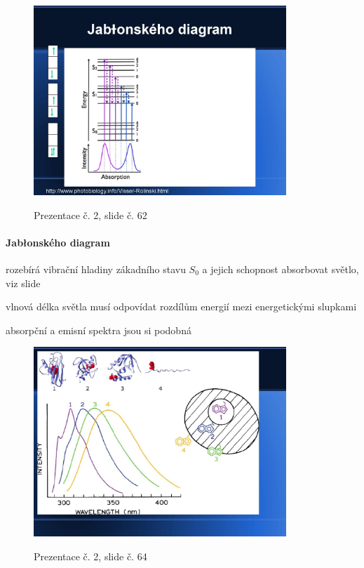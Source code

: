 \documentclass[DIV=8]{scrreprt}
\begin{document}
\begin{figure}
    \caption{Prezentace č. 2, slide č. 62}
    \includegraphics[width=0.85\textwidth]{slides-2/slide-62.jpg}
    \centering
    \label{slides-2-slide-62}
\end{figure}

\paragraph{Jabłonského diagram}
\begin{myItemize}[nosep]
    \item rozebírá vibrační hladiny zákadního stavu \(S_0\) a jejich schopnost absorbovat světlo, viz slide
    \item vlnová délka světla musí odpovídat rozdílům energií mezi energetickými slupkami
    \item absorpční a emisní spektra jsou si podobná
\end{myItemize}



\begin{figure}
    \caption{Prezentace č. 2, slide č. 64}
    \includegraphics[width=0.85\textwidth]{slides-2/slide-64.jpg}
    \centering
    \label{slides-2-slide-64}
\end{figure}
\end{document}
